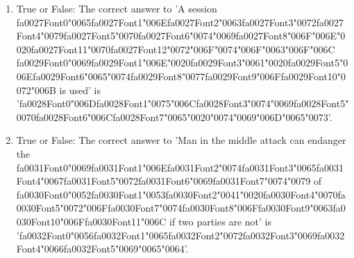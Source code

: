 \documentclass[12pt]{article}
\begin{document}
\begin{enumerate}[label=\arabic*.]
\item True or False: The correct answer to 'A session {\csname fa0027Font0\endcsname\char"0065}{\csname fa0027Font1\endcsname\char"006E}{\csname fa0027Font2\endcsname\char"0063}{\csname fa0027Font3\endcsname\char"0072}{\csname fa0027Font4\endcsname\char"0079}{\csname fa0027Font5\endcsname\char"0070}{\csname fa0027Font6\endcsname\char"0074}{\char"0069}{\csname fa0027Font8\endcsname\char"006F}{\char"006E}{\char"0020}{\csname fa0027Font11\endcsname\char"0070}{\csname fa0027Font12\endcsname\char"0072}{\char"006F}{\char"0074}{\char"006F}{\char"0063}{\char"006F}{\char"006C} {\csname fa0029Font0\endcsname\char"0069}{\csname fa0029Font1\endcsname\char"006E}{\char"0020}{\csname fa0029Font3\endcsname\char"0061}{\char"0020}{\csname fa0029Font5\endcsname\char"006E}{\csname fa0029Font6\endcsname\char"0065}{\char"0074}{\csname fa0029Font8\endcsname\char"0077}{\csname fa0029Font9\endcsname\char"006F}{\csname fa0029Font10\endcsname\char"0072}{\char"006B} is used' is '{\csname fa0028Font0\endcsname\char"006D}{\csname fa0028Font1\endcsname\char"0075}{\char"006C}{\csname fa0028Font3\endcsname\char"0074}{\char"0069}{\csname fa0028Font5\endcsname\char"0070}{\csname fa0028Font6\endcsname\char"006C}{\csname fa0028Font7\endcsname\char"0065}{\char"0020}{\char"0074}{\char"0069}{\char"006D}{\char"0065}{\char"0073}'.
\item True or False: The correct answer to 'Man in the middle attack can endanger the {\csname fa0031Font0\endcsname\char"0069}{\csname fa0031Font1\endcsname\char"006E}{\csname fa0031Font2\endcsname\char"0074}{\csname fa0031Font3\endcsname\char"0065}{\csname fa0031Font4\endcsname\char"0067}{\csname fa0031Font5\endcsname\char"0072}{\csname fa0031Font6\endcsname\char"0069}{\csname fa0031Font7\endcsname\char"0074}{\char"0079} of {\csname fa0030Font0\endcsname\char"0052}{\csname fa0030Font1\endcsname\char"0053}{\csname fa0030Font2\endcsname\char"0041}{\char"0020}{\csname fa0030Font4\endcsname\char"0070}{\csname fa0030Font5\endcsname\char"0072}{\char"006F}{\csname fa0030Font7\endcsname\char"0074}{\csname fa0030Font8\endcsname\char"006F}{\csname fa0030Font9\endcsname\char"0063}{\csname fa0030Font10\endcsname\char"006F}{\csname fa0030Font11\endcsname\char"006C} if two parties are not' is '{\csname fa0032Font0\endcsname\char"0056}{\csname fa0032Font1\endcsname\char"0065}{\csname fa0032Font2\endcsname\char"0072}{\csname fa0032Font3\endcsname\char"0069}{\csname fa0032Font4\endcsname\char"0066}{\csname fa0032Font5\endcsname\char"0069}{\char"0065}{\char"0064}'.

\end{enumerate}
\end{document}

